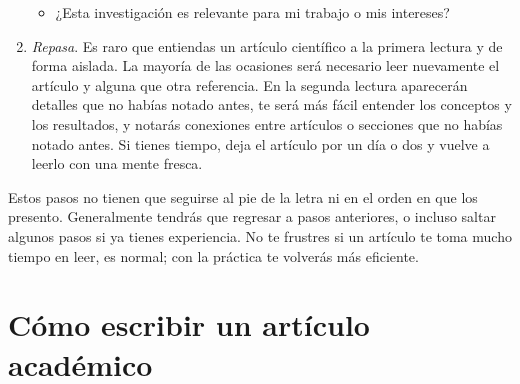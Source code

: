 \begin{enumerate}
\begin{itemize}
              \item ¿Esta investigación es relevante para mi trabajo o mis
                    intereses?
          \end{itemize}
    \item \emph{Repasa}. Es raro que entiendas un artículo científico a la
          primera lectura y de forma aislada.
          La mayoría de las ocasiones será necesario leer nuevamente el artículo
          y alguna que otra referencia.
          En la segunda lectura aparecerán detalles que no habías notado antes,
          te será más fácil entender los conceptos y los resultados, y notarás
          conexiones entre artículos o secciones que no habías notado antes.
          Si tienes tiempo, deja el artículo por un día o dos y vuelve a leerlo
          con una mente fresca.
\end{enumerate}

Estos pasos no tienen que seguirse al pie de la letra ni en el orden en que los
presento.
Generalmente tendrás que regresar a pasos anteriores, o incluso saltar algunos
pasos si ya tienes experiencia.
No te frustres si un artículo te toma mucho tiempo en leer, es normal; con la
práctica te volverás más eficiente.

\section{Cómo escribir un artículo académico}
\label{sec:comoescribir}
